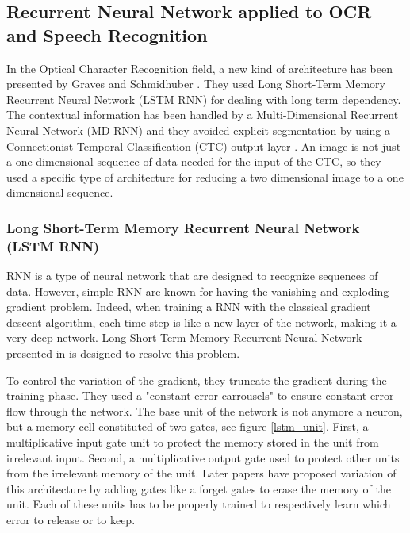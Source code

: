 \documentclass[11pt]{sdm}
\begin{document}
\subsection{Recurrent Neural Network applied to OCR and Speech Recognition}

In the Optical Character Recognition field, a new kind of architecture has been presented by Graves and Schmidhuber \cite{graves_offline_2009}.
They used Long Short-Term Memory Recurrent Neural Network (LSTM RNN) \cite{hochreiter_long_1997} for dealing with long term dependency.
The contextual information has been handled by a Multi-Dimensional Recurrent Neural Network (MD RNN) and they avoided explicit segmentation by using a Connectionist Temporal Classification (CTC) output layer \cite{graves_connectionist_2006}.
An image is not just a one dimensional sequence of data needed for the input of the CTC, so they used a specific type of architecture for reducing a two dimensional image to a one dimensional sequence.

\subsubsection{Long Short-Term Memory Recurrent Neural Network (LSTM RNN)}

RNN is a type of neural network that are designed to recognize sequences of data.
However, simple RNN are known for having the vanishing and exploding gradient problem.
Indeed, when training a RNN with the classical gradient descent algorithm, each time-step is like a new layer of the network, making it a very deep network.
Long Short-Term Memory Recurrent Neural Network presented in \cite{hochreiter_long_1997} is designed to resolve this problem.

To control the variation of the gradient, they truncate the gradient during the training phase.
They used a "constant error carrousels" to ensure constant error flow through the network.
The base unit of the network is not anymore a neuron, but a memory cell constituted of two gates, see figure \ref{lstm_unit}.
First, a multiplicative input gate unit to protect the memory stored in the unit from irrelevant input.
Second, a multiplicative output gate used to protect other units from the irrelevant memory of the unit.
Later papers have proposed variation of this architecture by adding gates like a forget gates to erase the memory of the unit.
Each of these units has to be properly trained to respectively learn which error to release or to keep.
\end{document}
